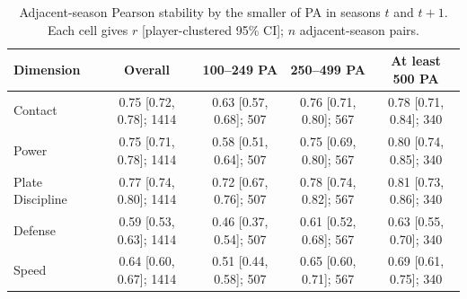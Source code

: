 \begin{table}[t]
\centering
\caption{Adjacent-season Pearson stability by the smaller of PA in seasons $t$ and $t+1$. Each cell gives $r$ [player-clustered 95\% CI]; $n$ adjacent-season pairs.}
\label{tab:stability}
\scriptsize
\setlength{\tabcolsep}{3pt}
\begin{tabular}{lcccc}
\toprule
Dimension & Overall & 100--249 PA & 250--499 PA & At least 500 PA \\
\midrule
Contact & 0.75 [0.72, 0.78]; 1414 & 0.63 [0.57, 0.68]; 507 & 0.76 [0.71, 0.80]; 567 & 0.78 [0.71, 0.84]; 340 \\
Power & 0.75 [0.71, 0.78]; 1414 & 0.58 [0.51, 0.64]; 507 & 0.75 [0.69, 0.80]; 567 & 0.80 [0.74, 0.85]; 340 \\
Plate Discipline & 0.77 [0.74, 0.80]; 1414 & 0.72 [0.67, 0.76]; 507 & 0.78 [0.74, 0.82]; 567 & 0.81 [0.73, 0.86]; 340 \\
Defense & 0.59 [0.53, 0.63]; 1414 & 0.46 [0.37, 0.54]; 507 & 0.61 [0.52, 0.68]; 567 & 0.63 [0.55, 0.70]; 340 \\
Speed & 0.64 [0.60, 0.67]; 1414 & 0.51 [0.44, 0.58]; 507 & 0.65 [0.60, 0.71]; 567 & 0.69 [0.61, 0.75]; 340 \\
\bottomrule
\end{tabular}
\end{table}
